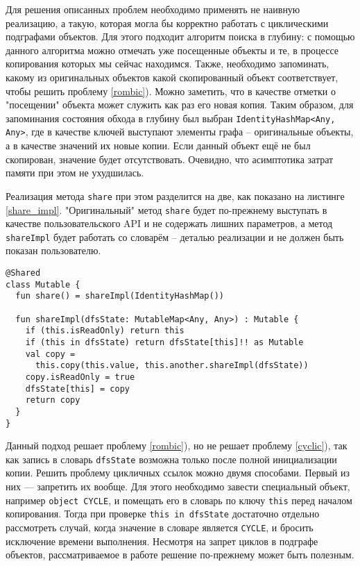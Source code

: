 \documentclass[specification,annotation,times]{itmo-student-thesis}
\begin{document}
Для решения описанных проблем необходимо применять не наивную реализацию,
а такую, которая могла бы корректно работать с циклическими подграфами объектов.
Для этого подходит алгоритм поиска в глубину: с помощью данного алгоритма можно отмечать уже посещенные объекты и те, в процессе копирования которых мы сейчас находимся.
Также, необходимо запоминать, какому из оригинальных объектов какой скопированный объект соответствует, чтобы решить проблему \ref{rombic}). 
Можно заметить, что в качестве отметки о "посещении" объекта может служить как раз его новая копия.
Таким образом, для запоминания состояния обхода в глубину был выбран \texttt{IdentityHashMap<Any, Any>}, где в качестве ключей выступают элементы графа -- оригинальные объекты, а в качестве значений их новые копии. Если данный объект ещё не был скопирован, значение будет отсутствовать.
Очевидно, что асимптотика затрат памяти при этом не ухудшилась.

Реализация метода \texttt{share} при этом разделится на две, как показано на листинге \ref{share_impl}.
"Оригинальный" метод \texttt{share} будет по-прежнему выступать в качестве пользовательского API и не содержать лишних параметров, а метод \texttt{shareImpl} будет работать со словарём -- деталью реализации и не должен быть показан пользователю.

\begin{lstlisting}[float=h!,caption={Усовершенствование \texttt{share}},label={share_impl}]
@Shared
class Mutable {
  fun share() = shareImpl(IdentityHashMap())
    
  fun shareImpl(dfsState: MutableMap<Any, Any>) : Mutable {
    if (this.isReadOnly) return this
	if (this in dfsState) return dfsState[this]!! as Mutable
	val copy = 
	  this.copy(this.value, this.another.shareImpl(dfsState))
	copy.isReadOnly = true
	dfsState[this] = copy
	return copy
  }
}
\end{lstlisting}

Данный подход решает проблему \ref{rombic}), но не решает проблему \ref{cyclic}), так как запись в словарь \texttt{dfsState} возможна только после полной инициализации копии.
Решить проблему цикличных ссылок можно двумя способами. Первый из них --- запретить их вообще. Для этого необходимо завести специальный объект, например \texttt{object CYCLE}, и помещать его в словарь по ключу \texttt{this} перед началом копирования.
Тогда при проверке \texttt{this in dfsState} достаточно отдельно рассмотреть случай, когда значение в словаре является \texttt{CYCLE}, и бросить исключение времени выполнения.
Несмотря на запрет циклов в подграфе объектов, рассматриваемое в работе решение по-прежнему может быть полезным.
\end{document}
